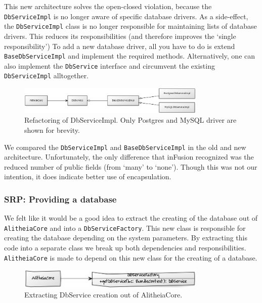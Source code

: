 \documentclass{article}
\begin{document}
This new architecture solves the open-closed violation, because the \verb|DbServiceImpl| is no longer aware of specific database drivers. As a side-effect, the \verb|DbServiceImpl| class is no longer responsible for maintaining lists of database drivers. This reduces its responsibilities (and therefore improves the `single responsibility') To add a new database driver, all you have to do is extend \verb|BaseDbServiceImpl| and implement the required methods. Alternatively, one can also implement the \verb|DbService| interface and circumvent the existing \verb|DbServiceImpl| alltogether.

\begin{figure}[h]
    \centering
    \includegraphics[width=0.8\textwidth]{dbs}
    \caption{Refactoring of DbServiceImpl. Only Postgres and MySQL driver are shown for brevity.}
    \label{fig:dbs}
\end{figure}

We compared the \verb|DbServiceImpl| and \verb|BaseDbServiceImpl| in the old and new architecture. Unfortunately, the only difference that inFusion recognized was the reduced number of public fields (from `many' to `none'). Though this was not our intention, it does indicate better use of encapsulation.

\subsubsection{SRP: Providing a database}
We felt like it would be a good idea to extract the creating of the database out of \verb|AlitheiaCore| and into a \verb|DbServiceFactory|. This new class is responsible for creating the database depending on the system parameters. By extracting this code into a separate class we break up both dependencies and responsibilities. \verb|AlitheiaCore| is made to depend on this new class for the creating of a database.

\begin{figure}[h]
    \centering
    \includegraphics[width=0.8\textwidth]{dbfactory}
    \caption{Extracting DbService creation out of AlitheiaCore.}
    \label{fig:dbfactory}
\end{figure}
\end{document}
